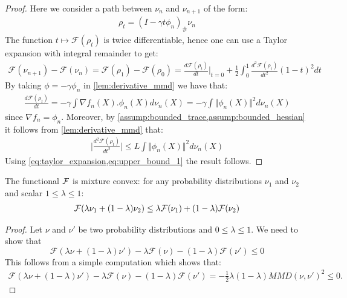 \begin{proof}
	
	Here we consider a path between $\nu_n$ and $\nu_{n+1}$ of the form:
	\begin{align*}
	\rho_t	=(I-\gamma t\phi_n)_{\#}\nu_n
	\end{align*}
	The function $t\mapsto \mathcal{F}(\rho_t)$ is twice differentiable, hence one can use a Taylor expansion with integral remainder to get:
	\begin{align}\label{eq:taylor_expansion}
	\mathcal{F}(\nu_{n+1})-\mathcal{F}(\nu_{n})=\mathcal{F}(\rho_1)-\mathcal{F}(\rho_0) = \frac{d \mathcal{F}(\rho_t) }{dt}\vert_{t=0}+ \frac{1}{2} \int_0^1 \frac{d^2 \mathcal{F}(\rho_t)}{dt^2}(1-t)^2 dt 
	\end{align} 
	By taking $\phi=-\gamma \phi_n$ in \cref{lem:derivative_mmd} we have that:
	\begin{align*}
	\frac{d \mathcal{F}(\rho_t) }{dt} = -\gamma \int \nabla f_n(X).\phi_n(X)d\nu_n(X)=-\gamma \int \Vert \phi_n(X) \Vert^2 d\nu_n(X)
	\end{align*}
	since $\nabla f_n=\phi_n$.
	Moreover, by \cref{assump:bounded_trace,assump:bounded_hessian} it follows from \cref{lem:derivative_mmd} that:
	\begin{align}\label{eq:upper_bound_1}
	\vert \frac{d^2 \mathcal{F}(\rho_t) }{dt^2}   \vert\leq L\int \Vert \phi_n(X) \Vert^2 d\nu_n(X)
	\end{align}
	Using \cref{eq:taylor_expansion,eq:upper_bound_1} the result follows.
\end{proof}

\vspace*{1cm}

\begin{lemma}\label{lem:mixture_convexity}
	The functional ${{\mathcal F}}$ is mixture convex: for any probability distributions $\nu_1$ and $\nu_2$ and scalar $1\leq \lambda\leq 1$:
	\begin{align*}
	{{\mathcal F}}(\lambda \nu_1+(1-\lambda)\nu_2)\leq \lambda {{\mathcal F}}(\nu_1)+ (1-\lambda){{\mathcal F}}(\nu_2)
	\end{align*}
\end{lemma}
\begin{proof}
	Let $\nu$ and $\nu'$ be two probability distributions and $0\leq \lambda\leq 1$.
	We need to show that \[\mathcal{F}(\lambda \nu + (1-\lambda)\nu') -\lambda \mathcal{F}(\nu) -(1-\lambda)\mathcal{F}(\nu')\leq 0\]
	This follows from a simple computation which shows that:
	\begin{align*}
	\mathcal{F}(\lambda \nu + (1-\lambda)\nu') -\lambda \mathcal{F}(\nu) -(1-\lambda)\mathcal{F}(\nu') = -\frac{1}{2}\lambda(1-\lambda)MMD(\nu,\nu')^2 \leq 0.
	\end{align*}
\end{proof}




 
